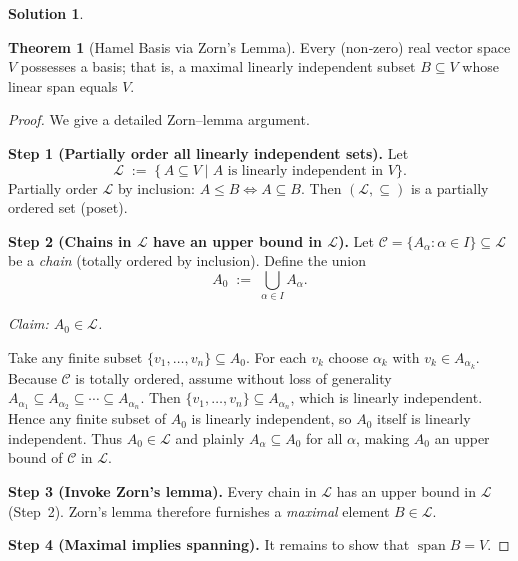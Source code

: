 \documentclass[12pt]{article}
\theoremstyle{definition} %
\newtheorem{solution}{Solution}
\newtheorem{theorem}{Theorem}
\theoremstyle{plain} %
\begin{document}
  \begin{solution}
    \begin{theorem}[Hamel Basis via Zorn’s Lemma]
      \label{thm:vector-space-basis}
      Every (non‑zero) real vector space \(V\) possesses a basis; that is,
      a maximal linearly independent subset \(B\subseteq V\) whose linear
      span equals \(V\).
      \end{theorem}
      
      \begin{proof}
      We give a detailed Zorn–lemma argument.
      
      \bigskip
      \textbf{Step 1 (Partially order all linearly independent sets).}
      Let
      \[
        \mathcal L \;:=\; \bigl\{\,A\subseteq V \mid A
               \text{ is linearly independent in }V\bigr\}.
      \]
      Partially order \(\mathcal L\) by inclusion:
      \(A\le B \iff A\subseteq B\).
      Then \((\mathcal L,\subseteq)\) is a partially ordered set (poset).
      
      \bigskip
      \textbf{Step 2 (Chains in \(\mathcal L\) have an upper bound in
      \(\mathcal L\)).}
      Let
      \(
        \mathcal C=\{A_\alpha : \alpha\in I\}\subseteq\mathcal L
      \)
      be a \emph{chain} (totally ordered by inclusion).
      Define the union
      \[
        A_0 \;:=\; \bigcup_{\alpha\in I} A_\alpha.
      \]
      
      \emph{Claim: \(A_0\in\mathcal L\).}
      
      Take any finite subset
      \(
        \{v_1,\dots,v_n\}\subseteq A_0
      \).
      For each \(v_k\) choose \(\alpha_k\) with \(v_k\in A_{\alpha_k}\).
      Because \(\mathcal C\) is totally ordered, assume without loss of
      generality \(A_{\alpha_1}\subseteq A_{\alpha_2}\subseteq\cdots
      \subseteq A_{\alpha_n}\).
      Then \(\{v_1,\dots,v_n\}\subseteq A_{\alpha_n}\), which is linearly
      independent. Hence any finite subset of \(A_0\) is linearly independent,
      so \(A_0\) itself is linearly independent.
      Thus \(A_0\in\mathcal L\) and plainly \(A_\alpha\subseteq A_0\)
      for all \(\alpha\), making \(A_0\) an upper bound of \(\mathcal C\)
      in \(\mathcal L\).
      
      \bigskip
      \textbf{Step 3 (Invoke Zorn’s lemma).}
      Every chain in \(\mathcal L\) has an upper bound in \(\mathcal L\)
      (Step~2).  Zorn’s lemma therefore furnishes a \emph{maximal} element
      \(B\in\mathcal L\).
      
      \bigskip
      \textbf{Step 4 (Maximal implies spanning).}
      It remains to show that \(\operatorname{span} B = V\).
      

\end{proof}
\end{solution}
\end{document}
